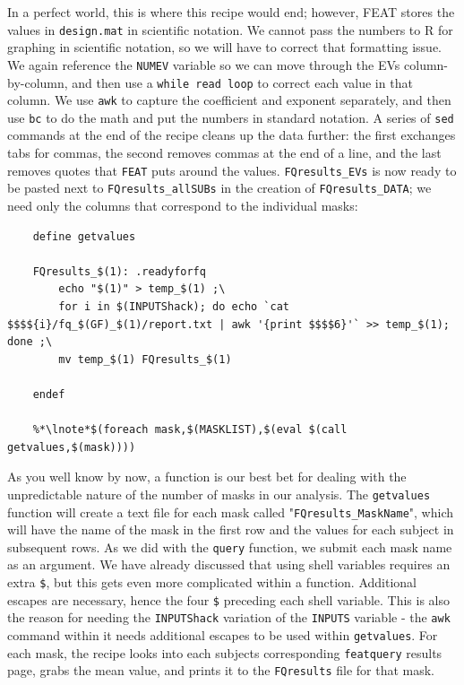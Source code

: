 In a perfect world, this is where this recipe would end; however, FEAT stores the values in \texttt{design.mat} in scientific notation. We cannot pass the numbers to R for graphing in scientific notation, so we will have to correct that formatting issue.  We again reference the \texttt{NUMEV} variable so we can move through the EVs column-by-column, and then use a \texttt{while read loop} to correct each value in that column. We use \texttt{awk} to capture the coefficient and exponent separately, and  then use \texttt{bc} to do the math and put the numbers in standard notation. A series of \texttt{sed} commands at the end of the recipe cleans up the data further: the first exchanges tabs for commas, the second removes commas at the end of a line, and the last removes quotes that \texttt{FEAT} puts around the values. \texttt{FQresults_EVs} is now ready to be pasted next to \texttt{FQresults_allSUBs} in the creation of \texttt{FQresults_DATA}; we need only the columns that correspond to the individual masks:
\begin{lstlisting}
	define getvalues
	
	FQresults_$(1): .readyforfq
		echo "$(1)" > temp_$(1) ;\
		for i in $(INPUTShack); do echo `cat $$$${i}/fq_$(GF)_$(1)/report.txt | awk '{print $$$$6}'` >> temp_$(1); done ;\
		mv temp_$(1) FQresults_$(1)
		
	endef
	
	%*\lnote*$(foreach mask,$(MASKLIST),$(eval $(call getvalues,$(mask))))
\end{lstlisting}
As you well know by now, a function is our best bet for dealing with the unpredictable nature of the number of masks in our analysis. The \texttt{getvalues} function will create a text file for each mask called "\texttt{FQresults_MaskName}", which will have the name of the mask in the first row and the values for each subject in subsequent rows. As we did with the \texttt{query} function, we submit each mask name as an argument. We have already discussed that using shell variables requires an extra \texttt{\$}, but this gets even more complicated within a function. Additional escapes are necessary, hence the four \texttt{\$} preceding each shell variable.  This is also the reason for needing the \texttt{INPUTShack} variation of the \texttt{INPUTS} variable - the \texttt{awk} command within it needs additional escapes to be used within \texttt{getvalues}. For each mask, the recipe looks into each subjects corresponding \texttt{featquery} results page, grabs the mean value, and prints it to the \texttt{FQresults} file for that mask.

